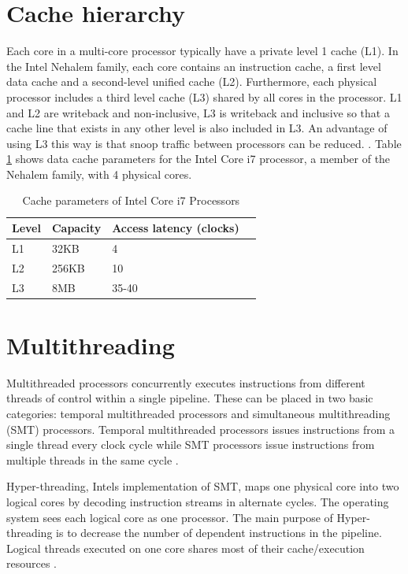 \section{Cache hierarchy}
\label{sec:cache-hierarchy}

Each core in a multi-core processor typically have a private level 1
cache (L1). In the Intel Nehalem family, each core contains an
instruction cache, a first level data cache and a second-level unified
cache (L2). Furthermore, each physical processor includes a third
level cache (L3) shared by all cores in the processor. L1 and L2 are
writeback and non-inclusive, L3 is writeback and inclusive so that a
cache line that exists in any other level is also included in L3. An
advantage of using L3 this way is that snoop traffic between
processors can be reduced.  \cite{inteloptimization}. Table
\ref{tab:cache-hierarchy} shows data cache parameters for the Intel
Core i7 processor, a member of the Nehalem family, with 4 physical
cores.

\begin{table}[H]
	\centering
	\begin{tabular}{|l|l|l|l|}
		\hline
		Level & Capacity & Access latency (clocks)  \\
		\hline \hline
		L1 & 32KB & 4 \\ \hline
		L2 & 256KB & 10 \\ \hline
		L3 & 8MB & 35-40 \\ \hline
	\end{tabular}
	\caption{Cache parameters of Intel Core i7 Processors}
	\label{tab:cache-hierarchy}
\end{table}

\section{Multithreading}

Multithreaded processors concurrently executes instructions from
different threads of control within a single pipeline. These can be
placed in two basic categories: temporal multithreaded processors and
simultaneous multithreading (SMT) processors. Temporal multithreaded
processors issues instructions from a single thread every clock cycle
while SMT processors issue instructions from multiple threads in the
same cycle \cite{crayxmt}.

Hyper-threading, Intels implementation of SMT, maps one physical core
into two logical cores by decoding instruction streams in alternate
cycles. The operating system sees each logical core as one processor.
The main purpose of Hyper-threading is to decrease the number of
dependent instructions in the pipeline. Logical threads executed on
one core shares most of their cache/execution resources
\cite{inteloptimization}.

